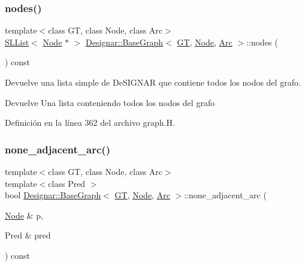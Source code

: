 \subsubsection{\texorpdfstring{nodes()}{nodes()}}
{\footnotesize\ttfamily template$<$class GT, class Node, class Arc$>$ \\
\hyperlink{class_designar_1_1_s_l_list}{S\+L\+List}$<$ \hyperlink{namespace_designar_a5af326c65aa2bd26b26c410f2030d09e}{Node} $\ast$ $>$ \hyperlink{class_designar_1_1_base_graph}{Designar\+::\+Base\+Graph}$<$ \hyperlink{demo-buildgraph_8_c_a3001c40d2c31ca87ed96cd7d1334a55e}{GT}, \hyperlink{namespace_designar_a5af326c65aa2bd26b26c410f2030d09e}{Node}, \hyperlink{namespace_designar_a3f55fb5513d62ff47cbc8f72b8e95d6f}{Arc} $>$\+::nodes (\begin{DoxyParamCaption}{ }\end{DoxyParamCaption}) const\hspace{0.3cm}{\ttfamily [inline]}}



Devuelve una lista simple de De\+S\+I\+G\+N\+AR que contiene todos los nodos del grafo. 

\begin{DoxyReturn}{Devuelve}
Una lista conteniendo todos los nodos del grafo 
\end{DoxyReturn}


Definición en la línea 362 del archivo graph.\+H.

\mbox{\label{class_designar_1_1_base_graph_acf4b230e0d981f36770722011c96206f}} 
\subsubsection{\texorpdfstring{none\+\_\+adjacent\+\_\+arc()}{none\_adjacent\_arc()}\hspace{0.1cm}{\footnotesize\ttfamily [1/2]}}
{\footnotesize\ttfamily template$<$class GT, class Node, class Arc$>$ \\
template$<$class Pred $>$ \\
bool \hyperlink{class_designar_1_1_base_graph}{Designar\+::\+Base\+Graph}$<$ \hyperlink{demo-buildgraph_8_c_a3001c40d2c31ca87ed96cd7d1334a55e}{GT}, \hyperlink{namespace_designar_a5af326c65aa2bd26b26c410f2030d09e}{Node}, \hyperlink{namespace_designar_a3f55fb5513d62ff47cbc8f72b8e95d6f}{Arc} $>$\+::none\+\_\+adjacent\+\_\+arc (\begin{DoxyParamCaption}\item[{\hyperlink{namespace_designar_a5af326c65aa2bd26b26c410f2030d09e}{Node} \&}]{p,  }\item[{Pred \&}]{pred }\end{DoxyParamCaption}) const\hspace{0.3cm}{\ttfamily [inline]}}



